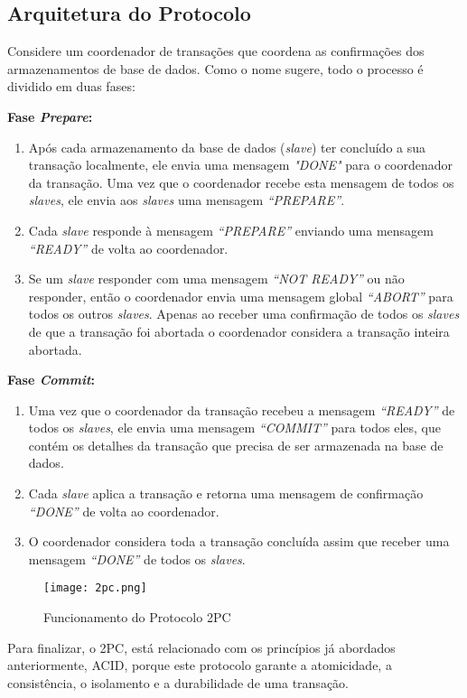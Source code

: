 \subsection{Arquitetura do Protocolo} 
Considere um coordenador de transações que coordena as confirmações dos armazenamentos de base de dados. Como o nome sugere, todo o processo é dividido em duas fases:
\hfill \break

\textbf{Fase \textit{Prepare}:}
\begin{enumerate}
    \item Após cada armazenamento da base de dados (\textit{slave}) ter concluído a sua transação localmente, ele envia uma mensagem \textit{"DONE"} para o coordenador da transação. Uma vez que o coordenador recebe esta mensagem de todos os \textit{slaves}, ele envia aos \textit{slaves} uma mensagem \textit{“PREPARE”}.
    \item Cada \textit{slave} responde à mensagem \textit{“PREPARE”} enviando uma mensagem \textit{“READY”} de volta ao coordenador.
    \item Se um \textit{slave} responder com uma mensagem \textit{“NOT READY”} ou não responder, então o coordenador envia uma mensagem global \textit{“ABORT”} para todos os outros \textit{slaves}. Apenas ao receber uma confirmação de todos os \textit{slaves} de que a transação foi abortada o coordenador considera a transação inteira abortada.
\end{enumerate}


\textbf{Fase \textit{Commit}:}
\begin{enumerate}
    \item Uma vez que o coordenador da transação recebeu a mensagem \textit{“READY”} de todos os \textit{slaves}, ele envia uma mensagem \textit{“COMMIT”} para todos eles, que contém os detalhes da transação que precisa de ser armazenada na base de dados.
    \item Cada \textit{slave} aplica a transação e retorna uma mensagem de confirmação \textit{“DONE”} de volta ao coordenador.
    \item O coordenador considera toda a transação concluída assim que receber uma mensagem \textit{“DONE”} de todos os \textit{slaves}.
\end{enumerate}


\begin{figure}[H]
\center
\texttt{[image: 2pc.png]}
\caption{Funcionamento do Protocolo 2PC}
\end{figure}

Para finalizar, o \ac{2PC}, está relacionado com os princípios já abordados anteriormente, \ac{ACID}, porque este protocolo garante a atomicidade, a consistência, o isolamento e a durabilidade de uma transação.


